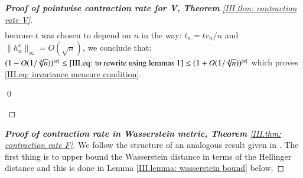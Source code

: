 \begin{proof}[\hypertarget{III.proof contraction pointwise V}{\textbf{Proof of pointwise contraction rate for V, Theorem} \ref{III.thm: contraction rate V}}]
\begin{align*}
    \end{align*}
    because $t$ was chosen to depend on $n$ in the way: $t_n = t r_n / n$ and $\| h^x_n\|_{\infty} = O(\sqrt{n})$, we conclude that: $ (1 -O(1/\sqrt[4]{n}))^{|\alpha|}\leq\eqref{III.eq: to rewrite using lemmas 1} \leq (1 +O(1/\sqrt[4]{n}))^{|\alpha|}$ which proves \eqref{III.eq: invariance measure condition}. \begin{flushright} \qed \end{flushright}    
\end{proof}




\begin{proof}[\hypertarget{III.proof contraction wasserstein}{\textbf{Proof of contraction rate in Wasserstein metric, Theorem} \ref{III.thm: contraction rate F}}] 
    We follow the structure of an analogous result given in \cite{25}. The first thing is to upper bound the Wasserstein distance in terms of the Hellinger distance and this is done in Lemma \ref{III.lemma: wasserstein bound} below. 


\end{proof}

